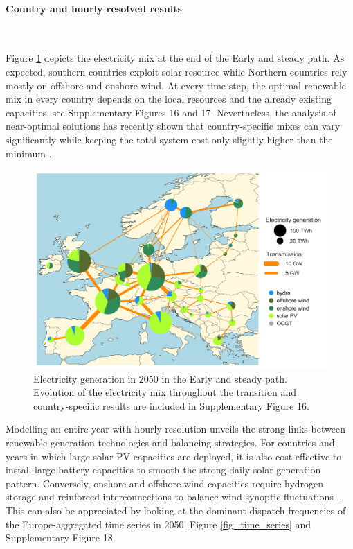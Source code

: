 \documentclass[5p]{elsarticle} %
\begin{document}
\paragraph{\textbf{Country and hourly resolved results}} \

Figure \ref{fig_spatial_plot} depicts the electricity mix at the end of the Early and steady path. As expected, southern countries exploit solar resource while Northern countries rely mostly on offshore and onshore wind. At every time step, the optimal renewable mix in every country depends on the local resources and the already existing capacities, see Supplementary Figures 16 and 17. Nevertheless, the analysis of near-optimal solutions has recently shown that country-specific mixes can vary significantly while keeping the total system cost only slightly higher than the minimum \cite{Neumann_2019}. \\

\begin{figure}[!h]
\centering
\includegraphics[width=\columnwidth]{../figures/spatial_electricity_generation_Base.png}
\caption{Electricity generation in 2050 in the Early and steady path. Evolution of the electricity mix throughout the transition and country-specific results are included in Supplementary Figure 16.} \label{fig_spatial_plot} 
\end{figure}



Modelling an entire year with hourly resolution unveils the strong links between renewable generation technologies and balancing strategies. For countries and years in which large solar PV capacities are deployed, it is also cost-effective to install large battery capacities to smooth the strong daily solar generation pattern. Conversely, onshore and offshore wind capacities require hydrogen storage and reinforced interconnections to balance wind synoptic fluctuations \cite{Rasmussen_2012, Schlachtberger_2017, Victoria_2019_storage}.  This can also be appreciated by looking at the dominant dispatch frequencies of the Europe-aggregated time series in 2050, Figure \ref{fig_time_series} and Supplementary Figure 18. \\
\end{document}
